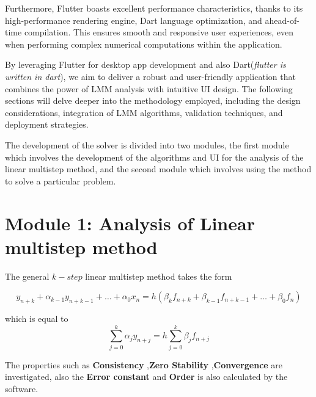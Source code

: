 Furthermore, Flutter boasts excellent performance characteristics, thanks to its high-performance rendering engine, Dart language optimization, and ahead-of-time compilation. This ensures smooth and responsive user experiences, even when performing complex numerical computations within the application.

By leveraging Flutter for desktop app development and also Dart(\textit{flutter is written in dart}), we aim to deliver a robust and user-friendly application that combines the power of LMM analysis with intuitive UI design. The following sections will delve deeper into the methodology employed, including the design considerations, integration of LMM algorithms, validation techniques, and deployment strategies.



The development of the solver is divided into two modules, the first module which involves the development of the algorithms and UI for the analysis of the linear multistep method, and the second module which involves using the method to solve a particular problem. 



\section{Module 1: Analysis of Linear multistep method}
The general $k-step$ linear multistep method takes the form 


\begin{equation}
   y_{n+k} + \alpha_{k-1}y_{n+k-1}+ \dots + \alpha_0x_n = h(\beta_kf_{n+k}+ \beta_{k-1}f_{n+k-1}+ \dots + \beta_0f_n) 
\end{equation}

which is equal to 
\begin{equation}
   \sum_{j=0}^{k} \alpha_j y_{n+j} = h \sum_{j=0}^{k} \beta_j f_{n+j}
\end{equation} \cite{2022JFatokunEtAl}

The properties such as \textbf{Consistency} ,\textbf{Zero Stability} ,\textbf{Convergence} are investigated, also the \textbf{Error constant} and \textbf{Order} is also calculated by the software.

